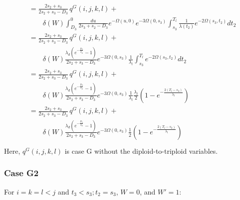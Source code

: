 \documentclass{article}
\begin{document}
\begin{align}
    \begin{split}
        &= \frac{2s_2+s_3}{2s_2+s_3-D_3}\,q^{G}(i,j,k,l)+\\
        &\qquad
        \delta(W)
        \int_{D_3}^{0}\frac{du}{2s_3+s_2-D_3}e^{-\Omega(u,0)}e^{-3\Omega(0,s_3)}\int_{s_3}^{T_l}\frac{1}{\lambda(t_2)}e^{-2\Omega(s_3,t_2)}dt_2\\
        &= \frac{2s_2+s_3}{2s_2+s_3-D_3}\,q^{G}(i,j,k,l)+\\
        &\qquad
        \delta(W)
        \frac{\lambda_d\left(e^{-\frac{D_3}{\lambda_d}}-1\right)}{2s_2+s_3-D_3}e^{-3\Omega(0,s_3)}\frac{1}{\lambda_l}\int_{s_3}^{T_l}e^{-2\Omega(s_3,t_2)}dt_2\\
        &= \frac{2s_2+s_3}{2s_2+s_3-D_3}\,q^{G}(i,j,k,l)+\\
        &\qquad
        \delta(W)
        \frac{\lambda_d\left(e^{-\frac{D_3}{\lambda_d}}-1\right)}{2s_2+s_3-D_3}e^{-3\Omega(0,s_3)}\frac{1}{\lambda_l}\frac{\lambda_l}{2}\left(1-e^{-\frac{2(T_l-s_3)}{\lambda_l}}\right)\\
        &= \frac{2s_2+s_3}{2s_2+s_3-D_3}\,q^{G}(i,j,k,l)+\\
        &\qquad
        \delta(W)
        \frac{\lambda_d\left(e^{-\frac{D_3}{\lambda_d}}-1\right)}{2s_2+s_3-D_3}e^{-3\Omega(0,s_3)}\frac{1}{2}\left(1-e^{-\frac{2(T_l-s_3)}{\lambda_l}}\right)\\
    \end{split}
\end{align}
Here, $q^G(i,j,k,l)$ is case G without the diploid-to-triploid variables.

\subsubsection{Case G2}
For $i=k=l<j$ and $t_3<s_3;t_2=s_3$, $W = 0$, and $W' = 1$:
\end{document}
